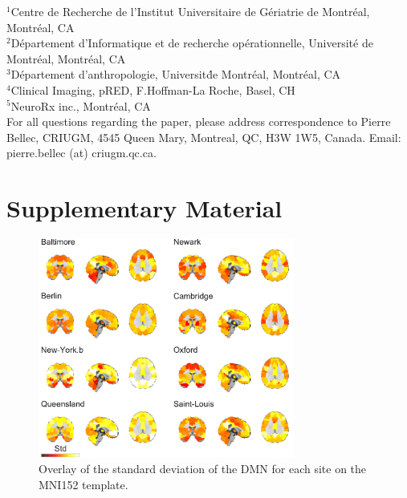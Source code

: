 \documentclass[authoryear]{elsarticle}
\begin{document}
$^1$Centre de Recherche de l'Institut Universitaire de G\'eriatrie de Montr\'eal, Montr\'eal, CA\\
$^2$D\'epartement d'Informatique et de recherche op\'erationnelle, Universit\'e de Montr\'eal, Montr\'eal, CA\\
$^3$D\'epartement d'anthropologie, Universit\' de Montr\'eal, Montr\'eal, CA\\
$^4$Clinical Imaging, pRED, F.Hoffman-La Roche, Basel, CH\\
$^5$NeuroRx inc., Montr\'eal, CA\\

For all questions regarding the paper, please address correspondence to Pierre Bellec, CRIUGM, 4545 Queen Mary, Montreal, QC, H3W 1W5, Canada. Email: pierre.bellec (at) criugm.qc.ca.\\

\section*{Supplementary Material} 

\begin{figure}[tbp]
\centering
\includegraphics[width=0.75\textwidth]{../figures/dmn_stdmultisite.pdf}
\caption[]{
Overlay of the standard deviation of the DMN for each site on the MNI152 template.
}
\label{fig_std_DMNs}
\end{figure}
\end{document}

